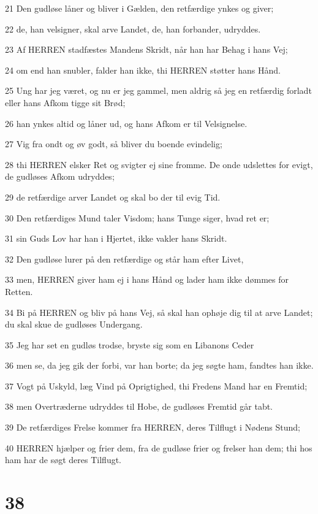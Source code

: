 \par 21 Den gudløse låner og bliver i Gælden, den retfærdige ynkes og giver;
\par 22 de, han velsigner, skal arve Landet, de, han forbander, udryddes.
\par 23 Af HERREN stadfæstes Mandens Skridt, når han har Behag i hans Vej;
\par 24 om end han snubler, falder han ikke, thi HERREN støtter hans Hånd.
\par 25 Ung har jeg været, og nu er jeg gammel, men aldrig så jeg en retfærdig forladt eller hans Afkom tigge sit Brød;
\par 26 han ynkes altid og låner ud, og hans Afkom er til Velsignelse.
\par 27 Vig fra ondt og øv godt, så bliver du boende evindelig;
\par 28 thi HERREN elsker Ret og svigter ej sine fromme. De onde udslettes for evigt, de gudløses Afkom udryddes;
\par 29 de retfærdige arver Landet og skal bo der til evig Tid.
\par 30 Den retfærdiges Mund taler Visdom; hans Tunge siger, hvad ret er;
\par 31 sin Guds Lov har han i Hjertet, ikke vakler hans Skridt.
\par 32 Den gudløse lurer på den retfærdige og står ham efter Livet,
\par 33 men, HERREN giver ham ej i hans Hånd og lader ham ikke dømmes for Retten.
\par 34 Bi på HERREN og bliv på hans Vej, så skal han ophøje dig til at arve Landet; du skal skue de gudløses Undergang.
\par 35 Jeg har set en gudløs trodse, bryste sig som en Libanons Ceder
\par 36 men se, da jeg gik der forbi, var han borte; da jeg søgte ham, fandtes han ikke.
\par 37 Vogt på Uskyld, læg Vind på Oprigtighed, thi Fredens Mand har en Fremtid;
\par 38 men Overtræderne udryddes til Hobe, de gudløses Fremtid går tabt.
\par 39 De retfærdiges Frelse kommer fra HERREN, deres Tilflugt i Nødens Stund;
\par 40 HERREN hjælper og frier dem, fra de gudløse frier og frelser han dem; thi hos ham har de søgt deres Tilflugt.

\chapter{38}


